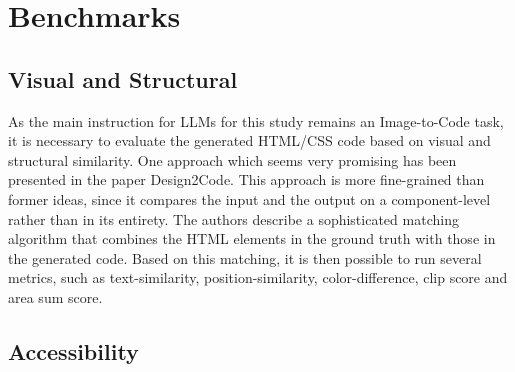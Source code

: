 \chapter{Benchmarks}\label{chapter:Benchmarks}

\section{Visual and Structural}
As the main instruction for LLMs for this study remains an Image-to-Code task, it 
is necessary to evaluate the generated HTML/CSS code based on visual and structural
similarity. One approach which seems very promising has been presented in the 
paper Design2Code. This approach is more fine-grained than former ideas, since 
it compares the input and the output on a component-level rather than in its entirety.
The authors describe a sophisticated matching algorithm that combines the 
HTML elements in the ground truth with those in the generated code. Based on this 
matching, it is then possible to run several metrics, such as text-similarity,
position-similarity, color-difference, clip score and area sum score.

\section{Accessibility}